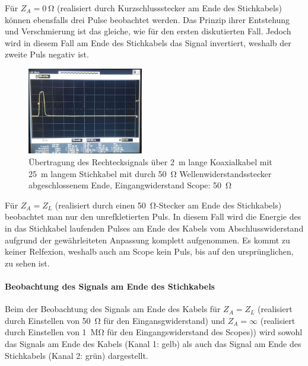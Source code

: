 \documentclass[a4paper,twoside,final]{article}
\begin{document}
Für \textbf{$Z_A = \SI{0}{\ohm}$} (realisiert durch Kurzschlussstecker am Ende des Stichkabels) können ebensfalls drei Pulse beobachtet werden. Das Prinzip ihrer Entstehung und \glqq Verschmierung\grqq{} ist das gleiche, wie für den ersten diskutierten Fall. Jedoch wird in diesem Fall am Ende des Stichkabels das Signal invertiert, weshalb der zweite Puls negativ ist. \\

\begin{figure}[htp]
    \centering
        \includegraphics[width=0.45\textwidth]{Bilder/Bild6.jpg}
    \caption{Übertragung des Rechtecksignals über \SI{2}{\meter} lange Koaxialkabel mit \SI{25}{\meter} langem Stichkabel mit durch \SI{50}{\ohm} Wellenwiderstandsstecker abgeschlossenem Ende, Eingangwiderstand Scope: \SI{50}{\ohm}}
\end{figure}

\FloatBarrier
Für \textbf{$Z_A = Z_L$} (realisiert durch einen \SI{50}{\ohm}-Stecker am Ende des Stichkabels) beobachtet man nur den unrefkletierten Puls. In diesem Fall wird die Energie des in das Stichkabel laufenden Pulses am Ende des Kabels vom Abschlusswiderstand aufgrund der gewährleiteten Anpassung komplett aufgenommen. Es kommt zu keiner Relfexion, weshalb auch am Scope kein Puls, bis auf den ursprünglichen, zu sehen ist. \\


\paragraph{Beobachtung des Signals am Ende des Stichkabels }
Beim der Beobachtung des Signals am Ende des Kabels für $Z_A = Z_L$ (realisiert durch Einstellen von \SI{50}{\ohm} für den Eingansgwiderstand) und $Z_A = \infty$ (realisiert durch Einstellen von \SI{1}{\mega\ohm} für den Eingangswiderstand des Scopes)) wird sowohl das Signals am Ende des Kabels (Kanal 1: gelb) als auch das Signal am Ende des Stichkabels (Kanal 2: grün) dargestellt.\\
\end{document}
